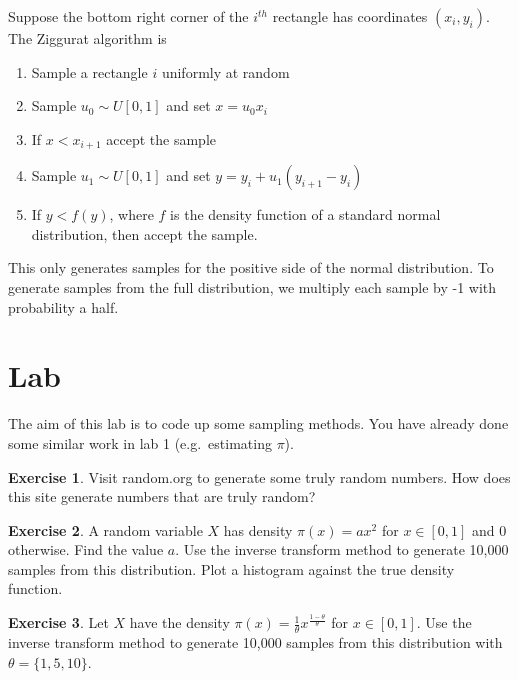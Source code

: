 \documentclass[
]{book}
\providecommand{\tightlist}{%
  \setlength{\itemsep}{0pt}\setlength{\parskip}{0pt}}
\theoremstyle{definition}
\theoremstyle{definition}
\theoremstyle{definition}
\newtheorem{exercise}{Exercise}[chapter]
\theoremstyle{definition}
\theoremstyle{remark}
\begin{document}
Suppose the bottom right corner of the \(i^{th}\) rectangle has coordinates \((x_i, y_i)\). The Ziggurat algorithm is

\begin{enumerate}
\def\labelenumi{\arabic{enumi}.}
\tightlist
\item
  Sample a rectangle \(i\) uniformly at random
\item
  Sample \(u_0 \sim U[0, 1]\) and set \(x = u_0x_i\)
\item
  If \(x < x_{i+1}\) accept the sample
\item
  Sample \(u_1 \sim U[0, 1]\) and set \(y = y_i + u_1(y_{i+1} − y_i)\)
\item
  If \(y < f(y)\), where \(f\) is the density function of a standard normal distribution, then accept the sample.
\end{enumerate}

This only generates samples for the positive side of the normal distribution. To generate samples from the full distribution, we multiply each sample by -1 with probability a half.

\hypertarget{lab-1}{%
\section{Lab}\label{lab-1}}

The aim of this lab is to code up some sampling methods. You have already done some similar work in lab 1 (e.g.~estimating \(\pi\)).

\begin{exercise}
Visit random.org to generate some truly random numbers. How does this site generate numbers that are truly random?
\end{exercise}

\begin{exercise}
A random variable \(X\) has density \(\pi(x) = ax^2\) for \(x\in[0,1]\) and 0 otherwise. Find the value \(a\). Use the inverse transform method to generate 10,000 samples from this distribution. Plot a histogram against the true density function.
\end{exercise}

\begin{exercise}
Let \(X\) have the density \(\pi(x) = \frac{1}{\theta}x^{\frac{1-\theta}{\theta}}\) for \(x \in [0, 1]\). Use the inverse transform method to generate 10,000 samples from this distribution with \(\theta = \{1, 5, 10\}\).
\end{exercise}
\end{document}
